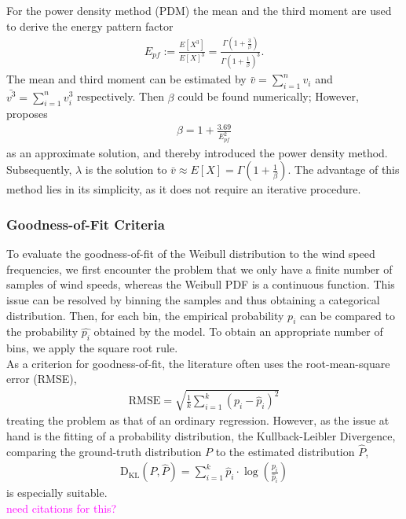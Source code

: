 \documentclass{article}
\theoremstyle{plain}
\theoremstyle{definition}
\theoremstyle{remark}
\begin{document}
For the power density method (PDM) the mean and the third moment are used to derive 
the energy pattern factor
\begin{align}
     E_{pf}:= \frac{E[X^3]}{E[X]^3}=\frac{ \Gamma \left( 1 + \frac{3}{\beta} \right)}{ \Gamma \left( 1 + \frac{1}{\beta} \right)^3}.
\end{align}
The mean and third moment can be estimated 
by $\bar v= \sum_{i=1}^n v_i$ and $\bar{v^3}= \sum_{i=1}^n  v_i^3$ respectively. 
Then $\beta$ could be found numerically; However, \citep{newestimator} 
proposes 
\begin{align}
    \beta= 1 + \frac{3.69}{E_{pf}^2}
\end{align}
as an approximate solution, and thereby introduced the power density method. 
Subsequently, $\lambda$ is the solution to $\bar v \approx E[X]=\Gamma \left( 1 + \frac{1}{\beta} \right)$.
The advantage of this method lies in its simplicity, as it does not require an iterative procedure. 

\subsubsection{Goodness-of-Fit Criteria}
To evaluate the goodness-of-fit of the Weibull distribution to the wind speed frequencies, 
we first encounter the problem that we only have a finite number of samples of wind speeds, 
whereas the Weibull PDF is a continuous function.
This issue can be resolved by binning the samples and thus obtaining a categorical distribution. 
Then, for each bin, the empirical probability $p_i$ can be compared to the probability $\hat{p_i}$ obtained by the model. 
To obtain an appropriate number of bins, we apply the square root rule.\\
As a criterion for goodness-of-fit, the literature
\citep{review, compestimators,newestimator} often uses the root-mean-square error (RMSE),
\begin{align}
    \mathrm{RMSE}=\sqrt{ \frac{1}{k}\sum_{i=1}^k(p_i-\hat p_i)^2}
\end{align}
treating the problem as that of an ordinary regression.
However, as the issue at hand is the fitting of a probability distribution, the Kullback-Leibler Divergence,
comparing the ground-truth distribution $P$ to the estimated distribution $\hat P$,
    \begin{align}
        \mathrm{D_{KL}}(P, \hat P)=\sum_{i=1}^k \hat p_i \cdot \log\left(\frac{p_i}{\hat p_i}\right)
    \end{align}
is especially suitable.\\
\textcolor{magenta}{need citations for this?}
\end{document}

